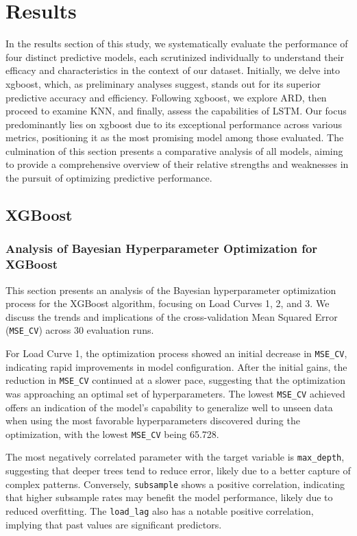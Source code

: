 \documentclass{article} %
\begin{document}
\section{Results}
In the results section of this study, we systematically evaluate the performance of four distinct predictive models, each scrutinized individually to understand their efficacy and characteristics in the context of our dataset. Initially, we delve into \gls{xgboost}, which, as preliminary analyses suggest, stands out for its superior predictive accuracy and efficiency. Following \gls{xgboost}, we explore \gls{ARD}, then proceed to examine \gls{KNN}, and finally, assess the capabilities of \gls{LSTM}. Our focus predominantly lies on \gls{xgboost} due to its exceptional performance across various metrics, positioning it as the most promising model among those evaluated. The culmination of this section presents a comparative analysis of all models, aiming to provide a comprehensive overview of their relative strengths and weaknesses in the pursuit of optimizing predictive performance. 

\subsection{XGBoost}

\subsubsection{Analysis of Bayesian Hyperparameter Optimization for XGBoost}
This section presents an analysis of the Bayesian hyperparameter optimization process for the XGBoost algorithm, focusing on Load Curves 1, 2, and 3. We discuss the trends and implications of the cross-validation Mean Squared Error (\texttt{MSE\_CV}) across 30 evaluation runs.

For Load Curve 1, the optimization process showed an initial decrease in \texttt{MSE\_CV}, indicating rapid improvements in model configuration. After the initial gains, the reduction in \texttt{MSE\_CV} continued at a slower pace, suggesting that the optimization was approaching an optimal set of hyperparameters. The lowest \texttt{MSE\_CV} achieved offers an indication of the model's capability to generalize well to unseen data when using the most favorable hyperparameters discovered during the optimization, with the lowest \texttt{MSE\_CV} being 65.728.

The most negatively correlated parameter with the target variable is \texttt{max\_depth}, suggesting that deeper trees tend to reduce error, likely due to a better capture of complex patterns. Conversely, \texttt{subsample} shows a positive correlation, indicating that higher subsample rates may benefit the model performance, likely due to reduced overfitting. The \texttt{load\_lag} also has a notable positive correlation, implying that past values are significant predictors.
\end{document}
